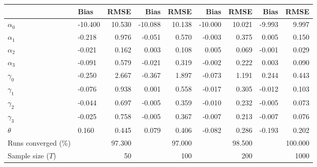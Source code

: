 
\begin{tabular}[t]{llrrrrrrr}
\toprule
  & Bias & RMSE & Bias & RMSE & Bias & RMSE & Bias & RMSE\\
\midrule
$\alpha_{0}$ & -10.400 & 10.530 & -10.088 & 10.138 & -10.000 & 10.021 & -9.993 & 9.997\\
$\alpha_{1}$ & -0.218 & 0.976 & -0.051 & 0.570 & -0.003 & 0.375 & 0.005 & 0.150\\
$\alpha_{2}$ & -0.021 & 0.162 & 0.003 & 0.108 & 0.005 & 0.069 & -0.001 & 0.029\\
$\alpha_{3}$ & -0.091 & 0.579 & -0.021 & 0.319 & -0.002 & 0.222 & 0.003 & 0.090\\
$\gamma_{0}$ & -0.250 & 2.667 & -0.367 & 1.897 & -0.073 & 1.191 & 0.244 & 0.443\\
$\gamma_{1}$ & -0.076 & 0.938 & 0.001 & 0.558 & -0.017 & 0.305 & -0.012 & 0.103\\
$\gamma_{2}$ & -0.044 & 0.697 & -0.005 & 0.359 & -0.010 & 0.232 & -0.005 & 0.073\\
$\gamma_{3}$ & -0.025 & 0.758 & -0.005 & 0.367 & -0.007 & 0.213 & -0.007 & 0.076\\
$\theta$ & 0.160 & 0.445 & 0.079 & 0.406 & -0.082 & 0.286 & -0.193 & 0.202\\
Runs converged (\%) &  & 97.300 &  & 97.000 &  & 98.500 &  & 100.000\\
Sample size ($T$) &  & 50 &  & 100 &  & 200 &  & 1000\\
\bottomrule
\end{tabular}
